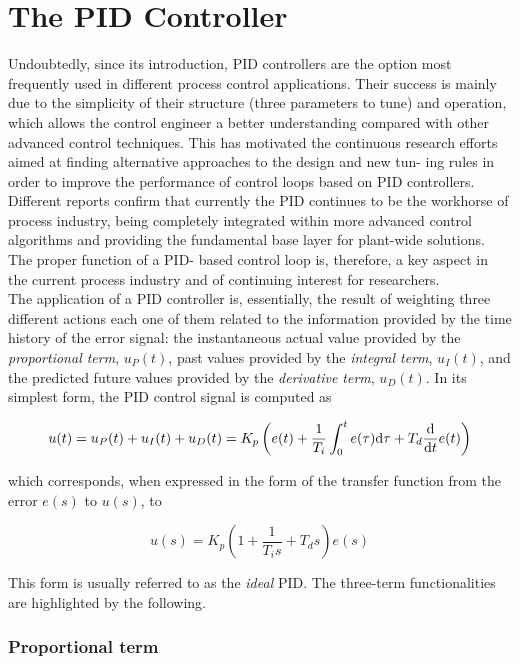 \section{The PID Controller}
\label{sec:3}
Undoubtedly, since its introduction, PID controllers are the option most frequently used in different process control applications. Their success is mainly due to the simplicity of their structure (three parameters to tune) and operation, which allows the control engineer a better understanding compared with other advanced control techniques. This has motivated the continuous research efforts aimed at finding alternative approaches to the design and new tun- ing rules in order to improve the performance of control loops based on PID controllers. Different reports confirm that currently the PID continues to be the workhorse of process industry, being completely integrated within more advanced control algorithms and providing the fundamental base layer for plant-wide solutions. The proper function of a PID- based control loop is, therefore, a key aspect in the current process industry and of continuing interest for researchers.\\

The application of a PID controller is, essentially, the result of weighting three different actions each one of them related to the information provided by the time history of the error signal: the instantaneous actual value provided by the  \emph{proportional term}, $u_P(t)$, past values provided by the \emph{integral term}, $u_I(t)$, and the predicted future values provided by the \emph{derivative term}, $u_D(t)$.  In its simplest form, the PID control signal is computed as

\begin{equation}
u(t)=u_P(t)+u_I(t)+u_D(t)= K_p \left ( e(t)+\frac{1}{T_i}\int_0^t e(\tau)\mathrm{d} \tau+T_d\frac{\mathrm{d}}{\mathrm{d} t}e(t) \right )
\end{equation}

\noindent which corresponds, when expressed in the form of the transfer function from the error $e(s)$ to $u(s)$, to

\begin{equation}
u(s)=K_p \left ( 1+\frac{1}{T_is}+{T_ds} \right )  e(s)
\label{Ch2eq:PID_ideal}
\end{equation}

This form is usually referred to as the \emph{ideal} PID. The three-term functionalities are highlighted by the following.

\subsubsection*{Proportional term}

